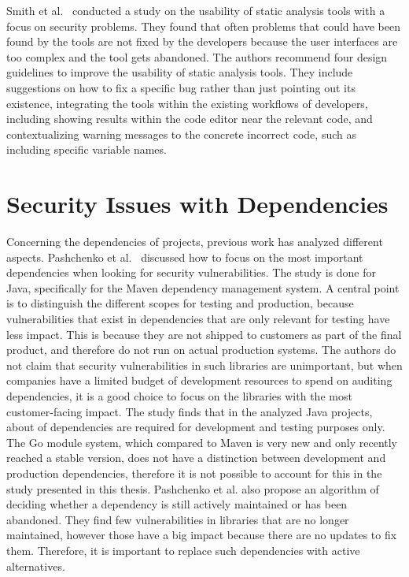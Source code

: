 Smith et al.~\cite{smith2020} conducted a study on the usability of static analysis tools with a focus on security
problems.
They found that often problems that could have been found by the tools are not fixed by the developers because the user
interfaces are too complex and the tool gets abandoned.
The authors recommend four design guidelines to improve the usability of static analysis tools.
They include suggestions on how to fix a specific bug rather than just pointing out its existence, integrating the tools
within the existing workflows of developers, including showing results within the code editor near the relevant code,
and contextualizing warning messages to the concrete incorrect code, such as including specific variable names.



\section{Security Issues with Dependencies}\label{sec:related-work:dependency-issues}

Concerning the dependencies of projects, previous work has analyzed different aspects.
Pashchenko et al.~\cite{pashchenko2018} discussed how to focus on the most important dependencies when looking for
security vulnerabilities.
The study is done for Java, specifically for the Maven dependency management system.
A central point is to distinguish the different scopes for testing and production, because vulnerabilities that exist in
dependencies that are only relevant for testing have less impact.
This is because they are not shipped to customers as part of the final product, and therefore do not run on actual
production systems.
The authors do not claim that security vulnerabilities in such libraries are unimportant, but when companies have a
limited budget of development resources to spend on auditing dependencies, it is a good choice to focus on the libraries
with the most customer-facing impact.
The study finds that in the analyzed Java projects, about  of dependencies are required for development
and testing purposes only.
The Go module system, which compared to Maven is very new and only recently reached a stable version, does not have a
distinction between development and production dependencies, therefore it is not possible to account for this in the
study presented in this thesis.
Pashchenko et al. also propose an algorithm of deciding whether a dependency is still actively maintained or has been
abandoned.
They find few vulnerabilities in libraries that are no longer maintained, however those have a big impact because there
are no updates to fix them.
Therefore, it is important to replace such dependencies with active alternatives.

